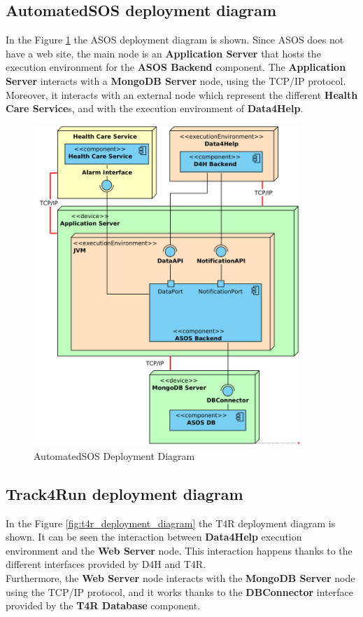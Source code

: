 \documentclass[a4paper, hidelinks, 12pt]{report}
\begin{document}
	\subsection{AutomatedSOS deployment diagram}
	In the Figure \ref{fig:asos_deployment_diagram} the ASOS deployment diagram is shown. Since ASOS does not have a web site, the main node is an \textbf{Application Server} that hosts the execution environment for the \textbf{ASOS Backend} component. The \textbf{Application Server} interacts with a \textbf{MongoDB Server} node, using the TCP/IP protocol. Moreover, it interacts with an external node which represent the different \textbf{Health Care Service}s, and with the execution environment of \textbf{Data4Help}.
		\begin{figure}[H]
			\centering
			\includegraphics[width=0.9\textwidth]{diagrams/asos_deployment_diagram.png}
			\caption[AutomatedSOS Deployment Diagram]{AutomatedSOS Deployment Diagram}
			\label{fig:asos_deployment_diagram}
		\end{figure}	
	
	\subsection{Track4Run deployment diagram}
	In the Figure \ref{fig:t4r_deployment_diagram} the T4R deployment diagram is shown. It can be seen the interaction between \textbf{Data4Help} execution environment and the \textbf{Web Server} node. This interaction happens thanks to the different interfaces provided by D4H and T4R. \\
	Furthermore, the \textbf{Web Server} node interacts with the \textbf{MongoDB Server} node using the TCP/IP protocol, and it works thanks to the \textbf{DBConnector} interface provided by the \textbf{T4R Database} component. \\
	
\end{document}
